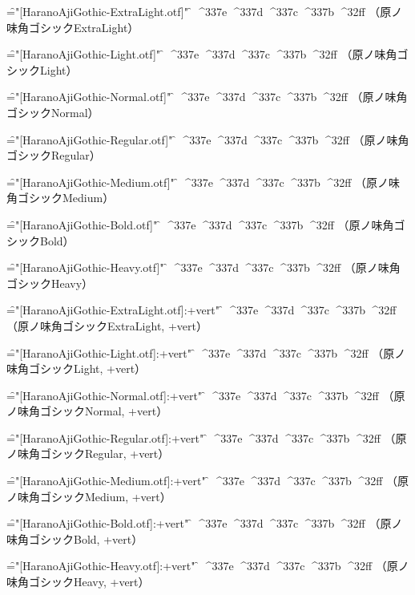 
\nopagenumbers

\font\f="[HaranoAjiGothic-ExtraLight.otf]" \f
^^^^337e
^^^^337d
^^^^337c
^^^^337b
^^^^32ff
（原ノ味角ゴシックExtraLight）\par

\font\f="[HaranoAjiGothic-Light.otf]" \f
^^^^337e
^^^^337d
^^^^337c
^^^^337b
^^^^32ff
（原ノ味角ゴシックLight）\par

\font\f="[HaranoAjiGothic-Normal.otf]" \f
^^^^337e
^^^^337d
^^^^337c
^^^^337b
^^^^32ff
（原ノ味角ゴシックNormal）\par

\font\f="[HaranoAjiGothic-Regular.otf]" \f
^^^^337e
^^^^337d
^^^^337c
^^^^337b
^^^^32ff
（原ノ味角ゴシックRegular）\par

\font\f="[HaranoAjiGothic-Medium.otf]" \f
^^^^337e
^^^^337d
^^^^337c
^^^^337b
^^^^32ff
（原ノ味角ゴシックMedium）\par

\font\f="[HaranoAjiGothic-Bold.otf]" \f
^^^^337e
^^^^337d
^^^^337c
^^^^337b
^^^^32ff
（原ノ味角ゴシックBold）\par

\font\f="[HaranoAjiGothic-Heavy.otf]" \f
^^^^337e
^^^^337d
^^^^337c
^^^^337b
^^^^32ff
（原ノ味角ゴシックHeavy）\par


\font\f="[HaranoAjiGothic-ExtraLight.otf]:+vert" \f
^^^^337e
^^^^337d
^^^^337c
^^^^337b
^^^^32ff
（原ノ味角ゴシックExtraLight, +vert）\par

\font\f="[HaranoAjiGothic-Light.otf]:+vert" \f
^^^^337e
^^^^337d
^^^^337c
^^^^337b
^^^^32ff
（原ノ味角ゴシックLight, +vert）\par

\font\f="[HaranoAjiGothic-Normal.otf]:+vert" \f
^^^^337e
^^^^337d
^^^^337c
^^^^337b
^^^^32ff
（原ノ味角ゴシックNormal, +vert）\par

\font\f="[HaranoAjiGothic-Regular.otf]:+vert" \f
^^^^337e
^^^^337d
^^^^337c
^^^^337b
^^^^32ff
（原ノ味角ゴシックRegular, +vert）\par

\font\f="[HaranoAjiGothic-Medium.otf]:+vert" \f
^^^^337e
^^^^337d
^^^^337c
^^^^337b
^^^^32ff
（原ノ味角ゴシックMedium, +vert）\par

\font\f="[HaranoAjiGothic-Bold.otf]:+vert" \f
^^^^337e
^^^^337d
^^^^337c
^^^^337b
^^^^32ff
（原ノ味角ゴシックBold, +vert）\par

\font\f="[HaranoAjiGothic-Heavy.otf]:+vert" \f
^^^^337e
^^^^337d
^^^^337c
^^^^337b
^^^^32ff
（原ノ味角ゴシックHeavy, +vert）\par


